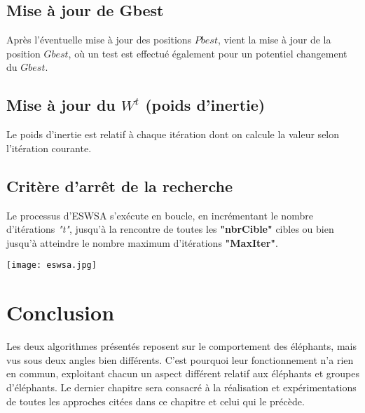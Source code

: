 \subsection{Mise à jour de Gbest}
Après l'éventuelle mise à jour des positions $Pbest$, vient la mise à jour de la position $Gbest$, où un test est effectué également pour un potentiel changement du $Gbest$.

\subsection{Mise à jour du $W^t$ (poids d'inertie)}
Le poids d'inertie est relatif à chaque itération dont on calcule la valeur selon l'itération courante.

\subsection{Critère d'arrêt de la recherche}
Le processus d'ESWSA s'exécute en boucle, en incrémentant le nombre d'itérations \textit{"t"},  jusqu'à la rencontre de toutes les \textbf{"nbrCible"} cibles ou bien jusqu'à atteindre le nombre maximum d'itérations \textbf{"MaxIter"}. 


\noindent
\begin{center}	  
	\captionsetup{width=1\linewidth}
	\texttt{[image: eswsa.jpg]}%
	\vspace{-0.3cm}
	\label{eswsa}%
\end{center}







\section{Conclusion}
Les deux algorithmes présentés reposent sur le comportement des éléphants, mais vus sous deux angles bien différents. C'est pourquoi leur fonctionnement n'a rien en commun, exploitant chacun un aspect différent relatif aux éléphants et groupes d'éléphants.
Le dernier chapitre sera consacré à la réalisation et expérimentations de toutes les approches citées dans ce chapitre et celui qui le précède.

